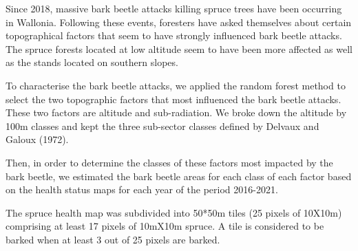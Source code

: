 \documentclass[3p,times]{elsarticle}
\begin{document}









Since 2018, massive bark beetle attacks killing spruce trees have been occurring in Wallonia. Following these events, foresters have asked themselves about certain topographical factors that seem to have strongly influenced bark beetle attacks.
The spruce forests located at low altitude seem to have been more affected as well as the stands located on southern slopes.

To characterise the bark beetle attacks, we applied the random forest method to select the two topographic factors that most influenced the bark beetle attacks. These two factors are altitude and sub-radiation. We broke down the altitude by 100m classes and kept the three sub-sector classes defined by Delvaux and Galoux (1972).

Then, in order to determine the classes of these factors most impacted by the bark beetle, we estimated the bark beetle areas for each class of each factor based on the health status maps for each year of the period 2016-2021.

The spruce health map was subdivided into 50*50m tiles (25 pixels of 10X10m) comprising at least 17 pixels of 10mX10m spruce. A tile is considered to be barked when at least 3 out of 25 pixels are barked.
\end{document}
